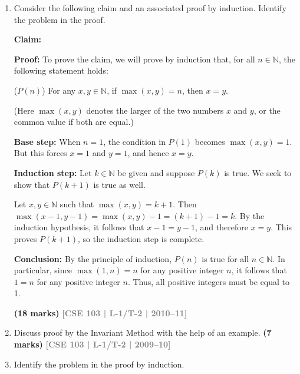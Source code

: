 \documentclass[12pt,a3paper]{article}
\newcommand{\yr}[1]{\hfill\textcolor{gray}{\small\textbf{[#1]}}}
\newcommand{\mk}[1]{\textcolor{orange!70!black}{\small\textbf{(#1 marks)}}}
\begin{document}
\begin{enumerate}
\item Consider the following claim and an associated proof by induction. Identify the problem in the proof.
\begin{tcolorbox}[breakable,colback=gray!5,colframe=gray!40,boxrule=0.5pt,arc=4pt,
  left=8pt,right=8pt,top=6pt,bottom=6pt]
  \small
\textbf{Claim:} 

\medskip
\noindent
\textbf{Proof:} To prove the claim, we will prove by induction that, for all $n \in \mathbb{N}$, the following statement holds:

\vspace{0.3cm}
\noindent
($P(n)$) \hfill For any $x, y \in \mathbb{N}$, if $\max(x,y) = n$, then $x = y$. \hfill \mbox{}

\vspace{0.3cm}
\noindent
(Here $\max(x,y)$ denotes the larger of the two numbers $x$ and $y$, or the common value if both are equal.)

\medskip
\noindent
\textbf{Base step:} When $n = 1$, the condition in $P(1)$ becomes $\max(x,y) = 1$. But this forces $x = 1$ and $y = 1$, and hence $x = y$.

\medskip
\noindent
\textbf{Induction step:} Let $k \in \mathbb{N}$ be given and suppose $P(k)$ is true. We seek to show that $P(k+1)$ is true as well.

\vspace{0.3cm}
\noindent
Let $x, y \in \mathbb{N}$ such that $\max(x,y) = k+1$. Then $\max(x-1, y-1) = \max(x,y) - 1 = (k+1) - 1 = k$. By the induction hypothesis, it follows that $x-1 = y-1$, and therefore $x = y$. This proves $P(k+1)$, so the induction step is complete.

\medskip
\noindent
\textbf{Conclusion:} By the principle of induction, $P(n)$ is true for all $n \in \mathbb{N}$. In particular, since $\max(1,n) = n$ for any positive integer $n$, it follows that $1 = n$ for any positive integer $n$. Thus, all positive integers must be equal to 1.
\end{tcolorbox}
\mk{18} \yr{CSE 103 | L-1/T-2 | 2010--11}


\item Discuss proof by the Invariant Method with the help of an example.
\mk{7} \yr{CSE 103 | L-1/T-2 | 2009--10}

\item Identify the problem in the proof by induction.

\begin{tcolorbox}[breakable,colback=gray!5,colframe=gray!40,boxrule=0.5pt,arc=4pt,
  left=8pt,right=8pt,top=6pt,bottom=6pt]
  \small
\begin{center}
\end{center}



\end{tcolorbox}
\end{enumerate}
\end{document}
